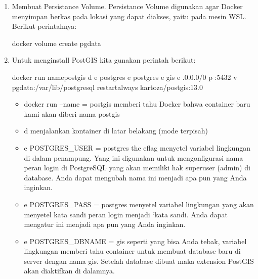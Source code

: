 \documentclass[letterpaper,10pt,english]{sphinxmanual}
\begin{document}
\begin{enumerate}
%
\item {} 
Membuat Persistance Volume.
Persistance Volume digunakan agar Docker menyimpan berkas pada lokasi yang dapat diakses, yaitu pada mesin WSL. Berikut perintahnya:

\begin{sphinxVerbatim}[commandchars=\\\{\}]
docker volume create pg\PYGZus{}data
\end{sphinxVerbatim}

\item {} 
Untuk menginstall PostGIS kita gunakan perintah berikut:

\begin{sphinxVerbatim}[commandchars=\\\{\}]
docker run \PYGZhy{}\PYGZhy{}namepostgis \PYGZhy{}d \PYGZhy{}e postgres \PYGZhy{}e postgres \PYGZhy{}e gis \PYGZhy{}e .0.0.0/0 \PYGZhy{}p :5432 \PYGZhy{}v pg\PYGZus{}data:/var/lib/postgresql \PYGZhy{}\PYGZhy{}restartalways kartoza/postgis:13.0
\end{sphinxVerbatim}
\begin{itemize}
\item {} 
docker run –name = postgis memberi tahu Docker bahwa container baru kami akan diberi nama postgis

\item {} 
\sphinxhyphen{}d menjalankan kontainer di latar belakang (mode terpisah)

\item {} 
\sphinxhyphen{}e POSTGRES\_USER = postgres the \sphinxhyphen{}eflag menyetel variabel lingkungan di dalam penampung. Yang ini digunakan untuk mengonfigurasi nama peran login di PostgreSQL yang akan memiliki hak superuser (admin) di database. Anda dapat mengubah nama ini menjadi apa pun yang Anda inginkan.

\item {} 
\sphinxhyphen{}e POSTGRES\_PASS = postgres menyetel variabel lingkungan yang akan menyetel kata sandi peran login menjadi `kata sandi. Anda dapat mengatur ini menjadi apa pun yang Anda inginkan.

\item {} 
\sphinxhyphen{}e POSTGRES\_DBNAME = gis seperti yang bisa Anda tebak, variabel lingkungan memberi tahu container untuk membuat database baru di server dengan nama gis. Setelah database dibuat maka extension PostGIS akan diaktifkan di dalamnya.


\end{itemize}
\end{enumerate}
\end{document}
